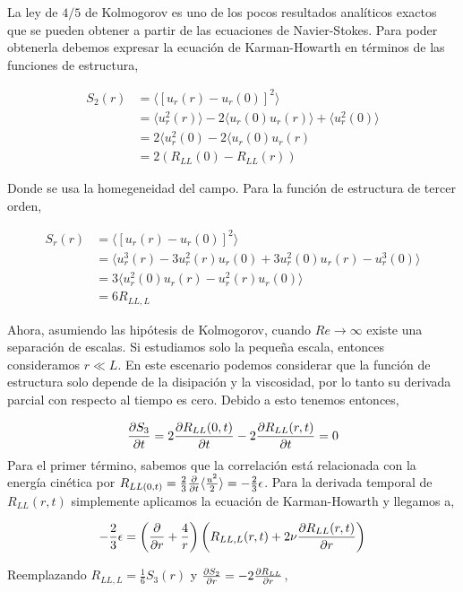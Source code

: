 \documentclass[executivepaper,12pt]{article}
\numberwithin{equation}{section}
\begin{document}
La ley de $4/5$ de Kolmogorov es uno de los pocos resultados analíticos exactos que se pueden obtener a partir de las ecuaciones de Navier-Stokes. Para poder obtenerla debemos expresar la ecuación de Karman-Howarth en términos de las funciones de estructura,

\begin{align*}
	S_2(r)&=\langle \left[u_r(r)-u_r(0)\right]^2 \rangle\\
	&=\langle u_r^2(r) \rangle -2\langle u_r(0)u_r(r) \rangle +\langle u_r^2(0) \rangle\\
	&=2\langle u_r^2(0) -2\langle u_r(0)u_r(r)\\
	&=2(R_{LL}(0)-R_{LL}(r))
\end{align*}

Donde se usa la homegeneidad del campo. Para la función de estructura de tercer orden,

\begin{align*}
	S_r(r)&=\langle \left[u_r(r)-u_r(0)\right]^2 \rangle\\
	&=\langle u_r^3(r) -3u_r^2(r)u_r(0) +3 u_r^2(0)u_r(r)-u_r^3(0) \rangle\\
	&= 3\langle u_r^2(0)u_r(r) - u_r^2(r)u_r(0)   \rangle\\
	&=6R_{LL,L}
\end{align*} 

Ahora, asumiendo las hipótesis de Kolmogorov, cuando $Re\to\infty$ existe una separación de escalas. Si estudiamos solo la pequeña escala, entonces consideramos $r\ll L$. En este escenario podemos considerar que la función de estructura solo depende de la disipación y la viscosidad, por lo tanto su derivada parcial con respecto al tiempo es cero. Debido a esto tenemos entonces,

\begin{equation*}
	\pdv{S_3}{t}=2\pdv{R_{LL}(0,t)}{t} - 2\pdv{R_{LL}(r,t)}{t}=0
\end{equation*}
Para el primer término, sabemos que la correlación está relacionada con la energía cinética por $R_{LL(0,t)}=\frac{2}{3} \pdv{}{t} \langle \frac{u^2}{2}\rangle =-\frac{2}{3}\epsilon$.  Para la derivada temporal de $R_{LL}(r,t)$ simplemente aplicamos la ecuación de Karman-Howarth y llegamos a,

\begin{equation*}
	-\frac{2}{3}\epsilon=\left(\pdv{}{r}+\frac{4}{r}\right)\left(R_{LL,L}(r,t)+2\nu\pdv{R_{LL}(r,t)}{r}\right)
\end{equation*}

Reemplazando $R_{LL,L}=\frac{1}{6}S_3(r)$ y $\pdv{S_2}{r}=-2\pdv{R_{LL}}{r}$, 
\end{document}

